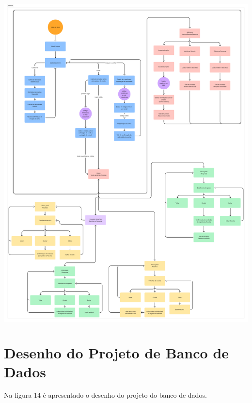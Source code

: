     \vspace{\baselineskip}
    \begin{center}
        \begin{minipage}{\textwidth}
            \centering
            \includegraphics[scale=0.1]{figs/figura13.png}
            \label{fig:figura13}
        \end{minipage}
    \end{center}

\section{Desenho do Projeto de Banco de Dados}

Na figura 14 é apresentado o desenho do projeto do banco de dados.

